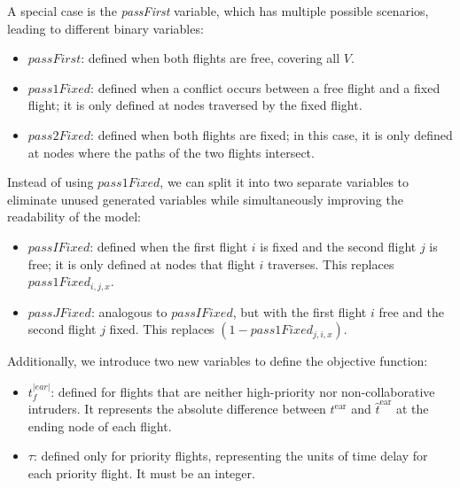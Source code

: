 \documentclass[../thesis.tex]{subfiles}
\begin{document}
A special case is the \textit{passFirst} variable, which has multiple possible scenarios, leading to different binary variables:

\begin{itemize}
    \item $passFirst$: defined when both flights are free, covering all $V$.
    \item $pass1Fixed$: defined when a conflict occurs between a free flight and a fixed flight; it is only defined at nodes traversed by the fixed flight.
    \item $pass2Fixed$: defined when both flights are fixed; in this case, it is only defined at nodes where the paths of the two flights intersect.
\end{itemize}

Instead of using $pass1Fixed$, we can split it into two separate variables to eliminate unused generated variables while simultaneously improving the readability of the model:

\begin{itemize}
    \item $passIFixed$: defined when the first flight $i$ is fixed and the second flight $j$ is free; it is only defined at nodes that flight $i$ traverses. This replaces $pass1Fixed_{i,j,x}$.
    \item $passJFixed$: analogous to $passIFixed$, but with the first flight $i$ free and the second flight $j$ fixed. This replaces $(1 - pass1Fixed_{j,i,x})$.
\end{itemize}
Additionally, we introduce two new variables to define the objective function:
\begin{itemize}
    \item $t^{|ear|}_{f}$: defined for flights that are neither high-priority nor non-collaborative intruders. It represents the absolute difference between $t^\text{ear}$ and $\hat{t}^\text{ear}$ at the ending node of each flight.
    \item $\tau$: defined only for priority flights, representing the units of time delay for each priority flight. It must be an integer.
\end{itemize}
\end{document}
